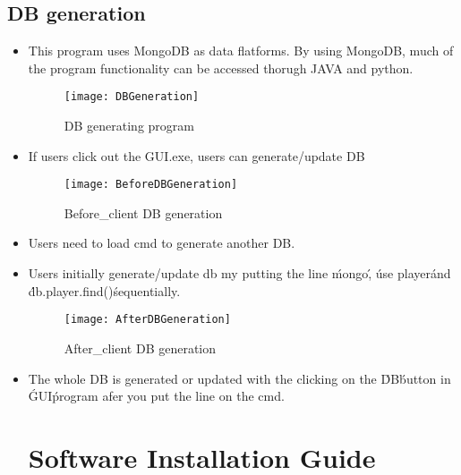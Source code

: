 \documentclass[conference,compsoc, twocolumn]{IEEEtran}
\begin{document}
\subsection{DB generation}

\begin{itemize}
\begin{figure}[H]
\centering\texttt{[image: DBgeneration-fc]}
\caption{DB generation-flow chart}
\end{figure}

\item This program uses MongoDB as data flatforms. By using MongoDB, much of the program functionality can be accessed thorugh JAVA and python.
\begin{figure}[H]
\centering\texttt{[image: DBGeneration]}
\caption{DB generating program}
\end{figure}
\item If users click out the GUI.exe, users can generate/update DB
\begin{figure}[H]
\centering\texttt{[image: BeforeDBGeneration]}
\caption{Before\_client DB generation}
\end{figure}
\item Users need to load cmd to generate another DB.
\item Users initially generate/update db my putting the line \'mongo\', \'use player\' and \'db.player.find()\' sequentially.
\begin{figure}[H]
\centering\texttt{[image: AfterDBGeneration]}
\caption{After\_client DB generation}
\end{figure}
\item The whole DB is generated or updated with the clicking on the \'DB\' button in \'GUI\' program afer you put the line on the cmd.

\section{Software Installation Guide}


\end{itemize}
\end{document}

